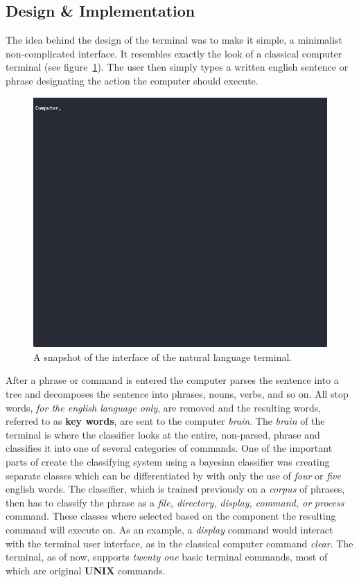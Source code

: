\documentclass[12pt]{article}
\begin{document}
\subsection{Design & Implementation}

The idea behind the design of the terminal was to make it simple, a minimalist non-complicated interface. It resembles exactly the look of a classical computer terminal (see figure~\ref{figure_one}). The user then simply types a written english sentence or phrase designating the action the computer should execute.

\begin{figure}
  \centering
    \includegraphics[width=\textwidth]{terminal}
  \caption{A snapshot of the interface of the natural language terminal.}
  \label{figure_one}
\end{figure}

After a phrase or command is entered the computer parses the sentence into a tree and decomposes the sentence into phrases, nouns, verbs, and so on. All stop words, {\it for the english language only}, are removed and the resulting words, referred to as \textbf{key words}, are sent to the computer {\it brain}. The {\it brain} of the terminal is where the classifier looks at the entire, non-parsed, phrase and classifies it into one of several categories of commands. One of the important parts of create the classifying system using a bayesian classifier was creating separate classes which can be differentiated by with only the use of {\it four} or {\it five} english words. The classifier, which is trained previously on a {\it corpus} of phrases, then has to classify the phrase as a {\it file, directory, display, command, or process} command. These classes where selected based on the component the resulting command will execute on. As an example, a {\it display} command would interact with the terminal user interface, as in the classical computer command {\it clear}. The terminal, as of now, supports {\it twenty one} basic terminal commands, most of which are original \textbf{UNIX} commands.
\end{document}
